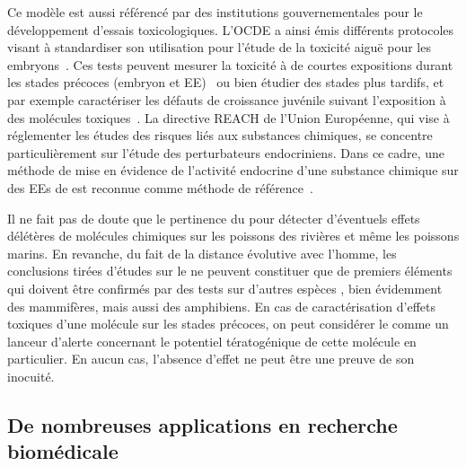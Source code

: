 \documentclass[\main/main.tex]{subfiles}
\begin{document}
%
Ce modèle est aussi référencé par des institutions gouvernementales pour le développement d'essais toxicologiques.
%
L'OCDE a ainsi émis différents protocoles visant à standardiser son utilisation pour l'étude de la toxicité aiguë pour les embryons~\cite{oecd_2013}. Ces tests peuvent mesurer la toxicité à de courtes expositions durant les stades précoces (embryon et EE)~\cite{oecd_2013a} ou bien étudier  des stades plus tardifs, et par exemple caractériser les défauts de croissance juvénile suivant l'exposition à des molécules toxiques~\cite{oecd_2000}.
%
La directive REACH de l'Union Européenne, qui vise à réglementer les études des risques liés aux substances chimiques, se concentre particulièrement sur l'étude des perturbateurs endocriniens.
%
Dans ce cadre, une méthode de mise en évidence de l'activité endocrine d'une substance chimique sur des EEs de \pz{} est reconnue comme méthode de référence~\cite{europeanchemicalagencyechaandeuropeanfoodsafetyauthorityefsawiththetechnicalsupportofthejointresearchcentrejrc_2018}.

Il ne fait pas de doute que le  pertinence du \pz{} pour détecter d'éventuels effets délétères de molécules chimiques sur les poissons des rivières et même les poissons marins. En revanche, du fait de la distance évolutive avec l'homme, les conclusions tirées d'études sur le \pz{} ne peuvent constituer que de premiers éléments  qui doivent être confirmés par des tests sur d'autres espèces , bien évidemment des mammifères, mais aussi des amphibiens. En cas de caractérisation d'effets toxiques d'une molécule sur les stades précoces, on peut considérer le \pz{} comme un lanceur d'alerte concernant le potentiel tératogénique de cette molécule en particulier. En aucun cas, l'absence d'effet ne peut être une preuve de son inocuité. 
%

    \subsection{De nombreuses applications en recherche biomédicale}
\end{document}
